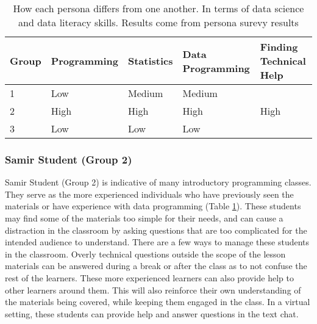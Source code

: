 \documentclass[020-persona\_validation.tex]{subfiles}
\begin{document}
        \begin{table}[]
            \centering
            \caption[Persona Data Science Skill Rating]
            {How each persona differs from one another. In terms of data science and data literacy skills.
             Results come from persona surevy results
            }
            \begin{tabular}{lllll}
            \hline
            Group & Programming & Statistics & Data Programming & Finding Technical Help \\
            \hline
            1     & Low         & Medium     & Medium           &                        \\
            2     & High        & High       & High             & High                   \\
            3     & Low         & Low        & Low              &                        \\
            \hline
            \end{tabular}
            \label{tab:persona-summary-table}
        \end{table}

        \subsubsection{Samir Student (Group 2)}

            Samir Student (Group 2) is indicative of many introductory programming classes.
            They serve as the more experienced individuals who have previously seen the materials
            or have experience with data programming (Table \ref{tab:persona-summary-table}).
            These students may find some of the materials too simple for their needs,
            and can cause a distraction in the classroom by asking questions that are too complicated
            for the intended audience to understand.
            There are a few ways to manage these students in the classroom.
            Overly technical questions outside the scope of the lesson materials
            can be answered during a break or after the class as to not confuse the rest of the learners.
            These more experienced learners can also provide help to other learners around them.
            This will also reinforce their own understanding of the materials being covered,
            while keeping them engaged in the class.
            In a virtual setting,
            these students can provide help and answer questions in the text chat.
\end{document}
